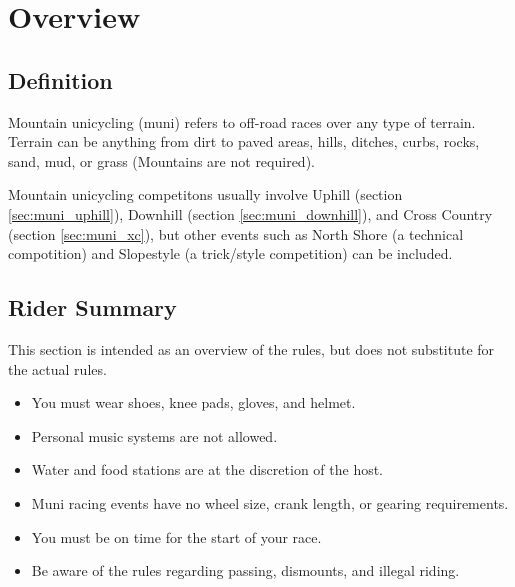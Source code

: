 \chapter{Overview \label{chap:muni_racing}}

\section{Definition}
Mountain unicycling (muni) refers to off-road races over any type of terrain.
Terrain can be anything from dirt to paved areas, hills, ditches, curbs, rocks, sand, mud, or grass (Mountains are not required).

Mountain unicycling competitons usually involve Uphill (section \ref{sec:muni_uphill}), Downhill (section \ref{sec:muni_downhill}), and Cross Country (section \ref{sec:muni_xc}), but other events such as North Shore (a technical compotition) and Slopestyle (a trick/style competition) can be included.

\section{Rider Summary}

This section is intended as an overview of the rules, but does not
substitute for the actual rules.

\begin{itemize}
\item You must wear shoes, knee pads, gloves, and helmet.
\item Personal music systems are not allowed.
\item Water and food stations are at the discretion of the host.
\item Muni racing events have no wheel size, crank length, or gearing 
requirements.
\item You must be on time for the start of your race.
\item Be aware of the rules regarding passing, dismounts, and illegal riding.
\end{itemize}